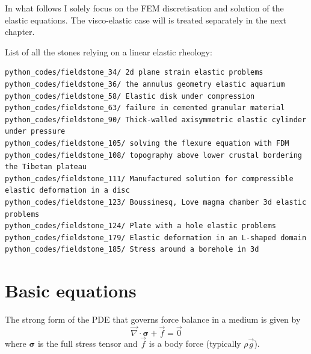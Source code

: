 In what follows I solely focus on the FEM discretisation and solution of the 
elastic equations. The visco-elastic case will is treated separately in the next chapter.

List of all the stones relying on a linear elastic rheology:
\begin{verbatim}
python_codes/fieldstone_34/ 2d plane strain elastic problems
python_codes/fieldstone_36/ the annulus geometry elastic aquarium
python_codes/fieldstone_58/ Elastic disk under compression
python_codes/fieldstone_63/ failure in cemented granular material
python_codes/fieldstone_90/ Thick-walled axisymmetric elastic cylinder under pressure
python_codes/fieldstone_105/ solving the flexure equation with FDM
python_codes/fieldstone_108/ topography above lower crustal bordering the Tibetan plateau
python_codes/fieldstone_111/ Manufactured solution for compressible elastic deformation in a disc
python_codes/fieldstone_123/ Boussinesq, Love magma chamber 3d elastic problems
python_codes/fieldstone_124/ Plate with a hole elastic problems
python_codes/fieldstone_179/ Elastic deformation in an L-shaped domain
python_codes/fieldstone_185/ Stress around a borehole in 3d
\end{verbatim}


\section{Basic equations}

The strong form of the PDE that governs force balance in a medium is given by
\begin{equation}
\vec{\nabla}\cdot{\bm \sigma}  + \vec{f} = \vec{0}
\label{eq:elast00}
\end{equation}
where ${\bm \sigma}$ is the full stress tensor and $\vec{f}$ is a body force
(typically $\rho \vec{g}$).

